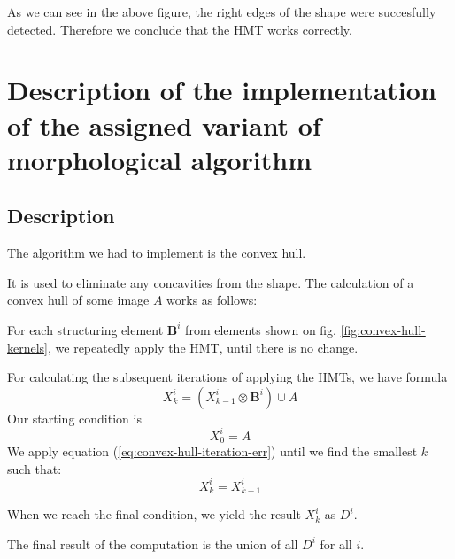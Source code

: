 \documentclass[12pt]{article}
\begin{document}
As we can see in the above figure, the right edges of the shape were succesfully detected.
Therefore we conclude that the HMT works correctly.

\section{Description of the implementation of the assigned variant of morphological algorithm}

\subsection{Description}
The algorithm we had to implement is the convex hull.

It is used to eliminate any concavities from the shape.
The calculation of a convex hull of some image $A$ works as follows:

For each structuring element $\mathbf{B}^i$ from elements shown on fig. \ref{fig:convex-hull-kernels},
we repeatedly apply the HMT, until there is no change.

For calculating the subsequent iterations of applying the HMTs, we have formula
\begin{equation}
    X^i_k = (X^i_{k-1} \otimes \mathbf{B}^i) \cup A
    \label{eq:convex-hull-iteration-err}
\end{equation}
Our starting condition is
\begin{equation}
    X^i_0 = A
    \label{eq:convex-hull-start-condition}
\end{equation}
We apply equation (\ref*{eq:convex-hull-iteration-err}) until we find the smallest $k$ such that:
\begin{equation}
    X^i_k = X^i_{k-1}
    \label{eq:convex-hull-final-condition}
\end{equation}

When we reach the final condition, we yield the result $X^i_k$ as $D^i$.

The final result of the computation is the union of all $D^i$ for all $i$.
\end{document}
